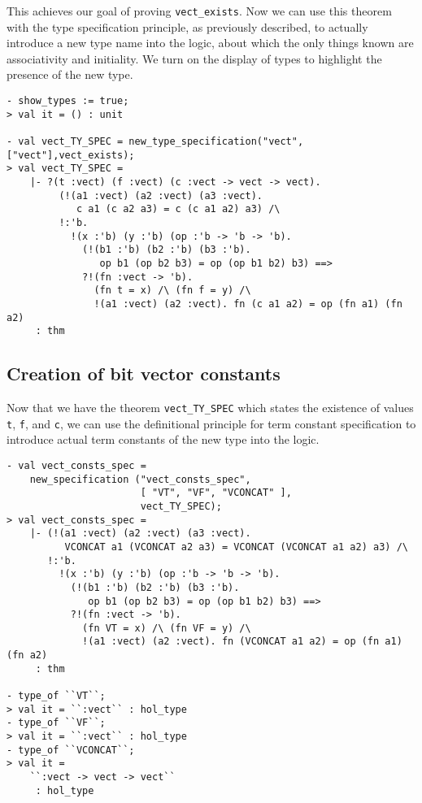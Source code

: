 This achieves our goal of proving \texttt{vect\_exists}.
Now we can use this theorem with the type specification principle, as previously
described, to actually introduce a new type name into the \HOLW{} logic,
about which the only things known
are associativity and initiality.
We turn on the display of types to highlight the presence of the new type.
%
\begin{session}
\begin{verbatim}
- show_types := true;
> val it = () : unit

- val vect_TY_SPEC = new_type_specification("vect",["vect"],vect_exists);
> val vect_TY_SPEC =
    |- ?(t :vect) (f :vect) (c :vect -> vect -> vect).
         (!(a1 :vect) (a2 :vect) (a3 :vect).
            c a1 (c a2 a3) = c (c a1 a2) a3) /\
         !:'b.
           !(x :'b) (y :'b) (op :'b -> 'b -> 'b).
             (!(b1 :'b) (b2 :'b) (b3 :'b).
                op b1 (op b2 b3) = op (op b1 b2) b3) ==>
             ?!(fn :vect -> 'b).
               (fn t = x) /\ (fn f = y) /\
               !(a1 :vect) (a2 :vect). fn (c a1 a2) = op (fn a1) (fn a2)
     : thm
\end{verbatim}
\end{session}

\subsection{Creation of bit vector constants}

Now that we have the theorem \texttt{vect\_TY\_SPEC} which states the existence
of values \texttt{t}, \texttt{f}, and \texttt{c}, we can use the
definitional principle for term constant specification to introduce actual
term constants of the new type into the logic.
%
\begin{session}
\begin{verbatim}
- val vect_consts_spec =
    new_specification ("vect_consts_spec",
                       [ "VT", "VF", "VCONCAT" ],
                       vect_TY_SPEC);
> val vect_consts_spec =
    |- (!(a1 :vect) (a2 :vect) (a3 :vect).
          VCONCAT a1 (VCONCAT a2 a3) = VCONCAT (VCONCAT a1 a2) a3) /\
       !:'b.
         !(x :'b) (y :'b) (op :'b -> 'b -> 'b).
           (!(b1 :'b) (b2 :'b) (b3 :'b).
              op b1 (op b2 b3) = op (op b1 b2) b3) ==>
           ?!(fn :vect -> 'b).
             (fn VT = x) /\ (fn VF = y) /\
             !(a1 :vect) (a2 :vect). fn (VCONCAT a1 a2) = op (fn a1) (fn a2)
     : thm

- type_of ``VT``;
> val it = ``:vect`` : hol_type
- type_of ``VF``;
> val it = ``:vect`` : hol_type
- type_of ``VCONCAT``;
> val it =
    ``:vect -> vect -> vect``
     : hol_type
\end{verbatim}
\end{session}

